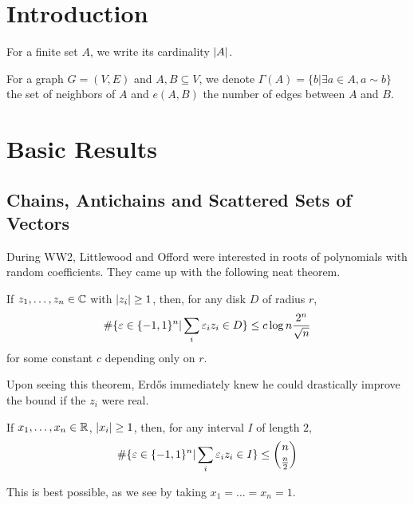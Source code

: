 \documentclass{article}
\begin{document}
\maketitle

\tableofcontents

\clearpage

\section{Introduction}

For a finite set $A$, we write its cardinality $\left\lvert A\right\rvert$.

For a graph $G = (V, E)$ and $A, B \subseteq V$, we denote $\Gamma(A) = \{b | \exists a \in A, a \sim b\}$ the set of neighbors of $A$ and $e(A, B)$ the number of edges between $A$ and $B$.

\clearpage

\section{Basic Results}

\subsection{Chains, Antichains and Scattered Sets of Vectors}

\newlec

During WW2, Littlewood and Offord were interested in roots of polynomials with random coefficients. They came up with the following neat theorem.

\begin{thm}
  If $z_1, \dots, z_n \in \mathbb C$ with $\left\lvert z_i\right\rvert \ge 1$, then, for any disk $D$ of radius $r$,
  $$\#\{\varepsilon \in \{-1, 1\}^n | \sum_i \varepsilon_i z_i \in D\} \le c \log n \frac{2^n}{\sqrt n}$$
  for some constant $c$ depending only on $r$.
\end{thm}

Upon seeing this theorem, Erd\H os immediately knew he could drastically improve the bound if the $z_i$ were real.

\begin{thm}[Erd\H os, 1945]
  If $x_1, \dots, x_n \in \mathbb R$, $\left\lvert x_i\right\rvert \ge 1$, then, for any interval $I$ of length $2$,
  $$\#\{\varepsilon \in \{-1, 1\}^n | \sum_i \varepsilon_i z_i \in I\} \le \binom n{\frac n 2}$$
\end{thm}

This is best possible, as we see by taking $x_1 = \dots = x_n = 1$.
\end{document}
